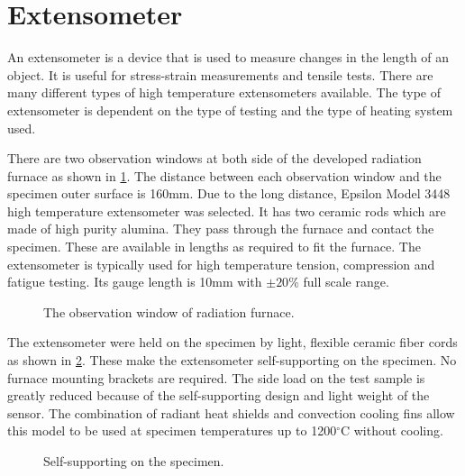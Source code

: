 \section{Extensometer}
An extensometer is a device that is used to measure changes in the length of an object.
It is useful for stress-strain measurements and tensile tests.
There are many different types of high temperature extensometers available.
The type of extensometer is dependent on the type of testing and the type of heating system used.

There are two observation windows at both side of the developed radiation furnace as shown in \ref{Fig:ObservationWindow}.
The distance between each observation window and the specimen outer surface is 160mm.
Due to the long distance, Epsilon Model 3448 high temperature extensometer was selected.
It has two ceramic rods which are made of high purity alumina.
They pass through the furnace and contact the specimen.
These are available in lengths as required to fit the furnace.
The extensometer is typically used for high temperature tension, compression and fatigue testing.
Its gauge length is 10mm with $\pm20\%$ full scale range.

\begin{figure}[!htp]
\centering{}
\caption{The observation window of radiation furnace.}
\label{Fig:ObservationWindow}
\end{figure}

The extensometer were held on the specimen by light, flexible ceramic fiber cords as shown in \ref{Fig:Epsilon3448}.
These make the extensometer self-supporting on the specimen.
No furnace mounting brackets are required.
The side load on the test sample is greatly reduced because of the self-supporting design and light weight of the sensor.
The combination of radiant heat shields and convection cooling fins allow this model to be used at specimen temperatures up to 1200$^{\circ}$C without cooling.
\begin{figure}[!htp]
\centering{}
\caption{Self-supporting on the specimen.}
\label{Fig:Epsilon3448}
\end{figure}

